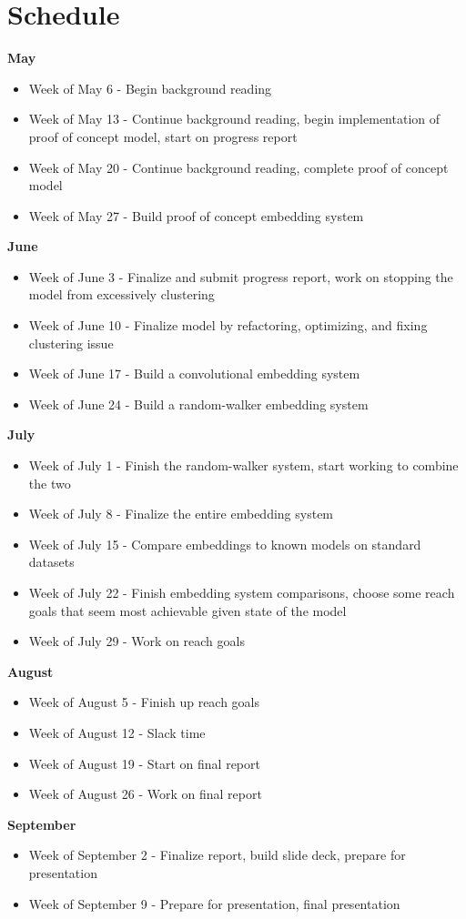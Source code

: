 \documentclass[10pt]{article}
\begin{document}
\pagebreak

\section{Schedule}

\textbf{May}
\begin{itemize}
\item Week of May 6 - Begin background reading
\item Week of May 13 - Continue background reading, begin implementation of proof of concept model, start on progress report
\item Week of May 20 - Continue background reading, complete proof of concept model
\item Week of May 27 - Build proof of concept embedding system
\end{itemize}
\textbf{June}
\begin{itemize}
\item Week of June 3 - Finalize and submit progress report, work on stopping the model from excessively clustering
\item Week of June 10 - Finalize model by refactoring, optimizing, and fixing clustering issue
\item Week of June 17 - Build a convolutional embedding system
\item Week of June 24 - Build a random-walker embedding system
\end{itemize}
\textbf{July}
\begin{itemize}
\item Week of July 1 - Finish the random-walker system, start working to combine the two
\item Week of July 8 - Finalize the entire embedding system
\item Week of July 15 - Compare embeddings to known models on standard datasets
\item Week of July 22 - Finish embedding system comparisons, choose some reach goals that seem most achievable given state of the model
\item Week of July 29 - Work on reach goals
\end{itemize}
\textbf{August}
\begin{itemize}
\item Week of August 5 - Finish up reach goals
\item Week of August 12 - Slack time
\item Week of August 19 - Start on final report
\item Week of August 26 - Work on final report
\end{itemize}
\textbf{September}
\begin{itemize}
\item Week of September 2 - Finalize report, build slide deck, prepare for presentation
\item Week of September 9 - Prepare for presentation, final presentation
\end{itemize}
\end{document}
